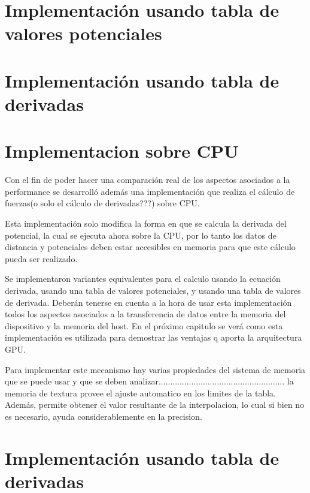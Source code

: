 \section{Implementación usando tabla de valores potenciales}
\section{Implementación usando tabla de derivadas}
\section{Implementacion sobre CPU}
Con el fin de poder hacer una comparación real de los aspectos asociados a la performance se desarrolló además una implementación que realiza el cálculo de fuerzas(o solo el cálculo de derivadas???) sobre CPU.

Esta implementación solo modifica la forma en que se calcula la derivada del potencial, la cual se ejecuta ahora sobre la CPU, por lo tanto los datos de distancia y potenciales deben estar accesibles en memoria para que este cálculo pueda ser realizado.

Se implementaron variantes equivalentes para el calculo usando la ecuación derivada, usando una tabla de valores potenciales, y usando una tabla de valores de derivada.
Deberán tenerse en cuenta a la hora de usar esta implementación todos los aspectos asociados a la transferencia de datos entre la memoria del dispositivo y la memoria del host. En el próximo capitulo se verá como esta implementación es utilizada para demostrar las ventajas q aporta la arquitectura GPU.


Para implementar este mecanismo hay varias propiedades del sistema de memoria que se puede usar y que se deben analizar......................................................
la memoria de textura provee el ajuste automatico en los limites de la tabla. Además, permite obtener el valor resultante de la interpolacion, lo cual si bien no es necesario, ayuda considerablemente en la precision.



\section{Implementación usando tabla de derivadas}


